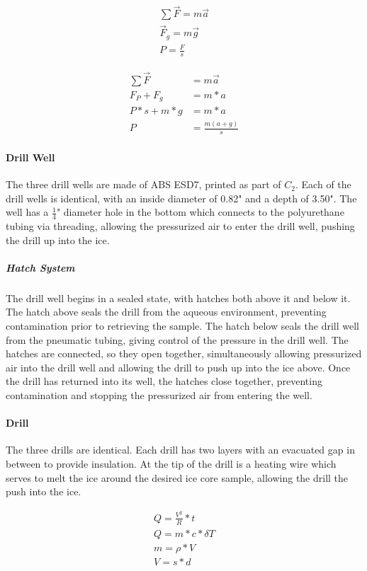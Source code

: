 \documentclass{article}
\begin{document}
\begin{gather*}
    \sum \vec{F} = m \vec{a} \\
    \vec{F}_g = m \vec{g}\\
    P = \frac{F}{s}
\end{gather*}

\begin{align*}
    \sum \vec{F} &= m \vec{a} \\
    F_P + F_g &= m*a \\
    P*s + m*g &= m*a \\
    P &= \frac{m (a+g)}{s}
\end{align*}

\paragraph{Drill Well}
The three drill wells are made of ABS ESD7, printed as part of $C_2$. Each of the drill wells is identical, with an inside diameter of 0.82" and a depth of 3.50". The well has a $\frac{1}{4}$" diameter hole in the bottom which connects to the polyurethane tubing via threading, allowing the pressurized air to enter the drill well, pushing the drill up into the ice.
\subparagraph{Hatch System}
The drill well begins in a sealed state, with hatches both above it and below it. The hatch above seals the drill from the aqueous environment, preventing contamination prior to retrieving the sample. The hatch below seals the drill well from the pneumatic tubing, giving control of the pressure in the drill well. The hatches are connected, so they open together, simultaneously allowing pressurized air into the drill well and allowing the drill to push up into the ice above. Once the drill has returned into its well, the hatches close together, preventing contamination and stopping the pressurized air from entering the well.
\paragraph{Drill}
The three drills are identical. Each drill has two layers with an evacuated gap in between to provide insulation. At the tip of the drill is a heating wire which serves to melt the ice around the desired ice core sample, allowing the drill the push into the ice.


\begin{gather*}
    Q = \frac{V^2}{R}*t \\
    Q = m*c*\delta T \\
    m = \rho * V \\
    V = s*d \\
\end{gather*}
\end{document}
